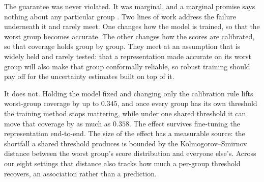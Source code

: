 \documentclass[pdflatex,sn-basic]{sn-jnl}%
\theoremstyle{thmstyleone}%
\begin{document}
The guarantee was never violated. It was marginal, and a marginal promise says nothing
about any particular group \citep{cresswell2024}. Two lines of work address the failure
underneath it and rarely meet. One changes how the model is trained, so that the worst
group becomes accurate. The other changes how the scores are calibrated, so that
coverage holds group by group. They meet at an assumption that is widely held and rarely tested: that a representation
made accurate on its worst group will also make that group conformally reliable, so
robust training should pay off for the uncertainty estimates built on top of it.

It does not. Holding the model fixed and changing only the calibration rule lifts worst-group
coverage by up to $0.345$, and once every group has its own threshold the training method stops
mattering, while under one shared threshold it can move that coverage by as much as $0.358$. The effect survives
fine-tuning the representation end-to-end. The size of the effect has a measurable source: the shortfall a shared
threshold produces is bounded by the Kolmogorov--Smirnov distance between the worst group's score
distribution and everyone else's. Across our eight settings that distance also tracks how much a
per-group threshold recovers, an association rather than a prediction.
\end{document}

